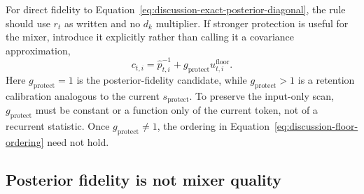 \documentclass[11pt]{article}
\begin{document}
For direct fidelity to Equation~\eqref{eq:discussion-exact-posterior-diagonal}, the rule should use
$r_t$ as written and no $d_k$ multiplier. If stronger protection is useful for the mixer, introduce
it explicitly rather than calling it a covariance approximation,
\begin{equation}
  c_{t,i}
  =\widehat p_{t,i}^{-1}
   +g_{\mathrm{protect}}u_{t,i}^{\mathrm{floor}}.
  \label{eq:discussion-floor-protection-scale}
\end{equation}
Here $g_{\mathrm{protect}}=1$ is the posterior-fidelity candidate, while
$g_{\mathrm{protect}}>1$ is a retention calibration analogous to the current
$s_{\mathrm{protect}}$. To preserve the input-only scan, $g_{\mathrm{protect}}$ must be constant or
a function only of the current token, not of a recurrent statistic. Once
$g_{\mathrm{protect}}\ne1$, the ordering in Equation~\eqref{eq:discussion-floor-ordering} need not
hold.

\subsection{Posterior fidelity is not mixer quality}
\end{document}
